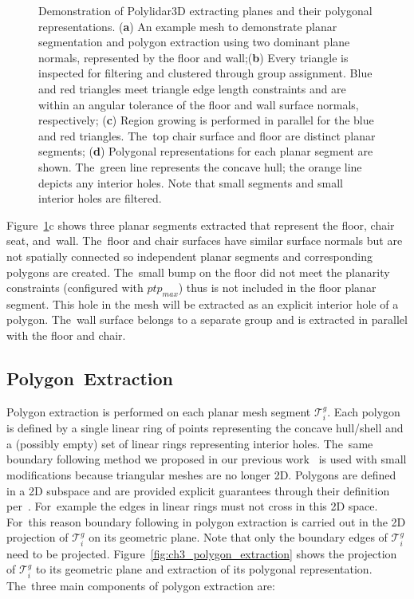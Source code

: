 \begin{figure}[!ht]
  \caption[Demonstration of Polylidar3D extracting planes and their polygonal representations]{Demonstration of Polylidar3D extracting planes and their polygonal representations. (\textbf{a}) An example mesh to demonstrate planar segmentation and polygon extraction using two dominant plane normals, represented by the floor and wall;(\textbf{b}) Every triangle is inspected for filtering and clustered through group assignment. Blue and red triangles meet triangle edge length constraints and are within an angular tolerance of the floor and wall surface normals, respectively; (\textbf{c}) Region growing is performed in parallel for the blue and red triangles. The~top chair surface and floor are distinct planar segments;  (\textbf{d}) Polygonal representations for each planar segment are shown. The~green line represents the concave hull; the orange line depicts any interior holes. Note that small segments and small interior holes are filtered. 
  }\label{fig:ch3_planar_segmenti}
\end{figure}

Figure~\ref{fig:ch3_planar_segmenti}c shows three planar segments extracted that represent the floor, chair seat, and~wall. The~floor and chair surfaces have similar surface normals but are not spatially connected so independent planar segments and corresponding polygons are created. The~small bump on the floor did not meet the planarity constraints (configured with $ptp_{max}$) thus is not included in the floor planar segment. This hole in the mesh will be extracted as an explicit interior hole of a polygon. The~wall surface belongs to a separate group and is extracted in parallel with the floor and chair. 

\subsection{Polygon~Extraction}\label{sec:ch3_methods_polylidar_polygon_extraction}

Polygon extraction is performed on each planar mesh segment $\mathcal{T}^{g}_i$. Each polygon is defined by a single linear ring of points representing the concave hull/shell and a (possibly empty) set of linear rings representing interior holes. The~same boundary following method we proposed in our previous work~\cite{castagno_polylidar_2020} is used with small modifications because triangular meshes are no longer 2D.  Polygons are defined in a 2D subspace and are provided explicit guarantees through their definition per~\cite{herring_opengis_2006-1}. For~example the edges in linear rings must not cross in this 2D space.  For~this reason boundary following in polygon extraction is carried out in the 2D projection of $\mathcal{T}^{g}_i$ on its geometric plane. Note that only the boundary edges of $\mathcal{T}^{g}_i$ need to be projected. Figure~\ref{fig:ch3_polygon_extraction} shows the projection of $\mathcal{T}^{g}_i$ to its geometric plane and extraction of its polygonal representation. The~three main components of polygon extraction are:

